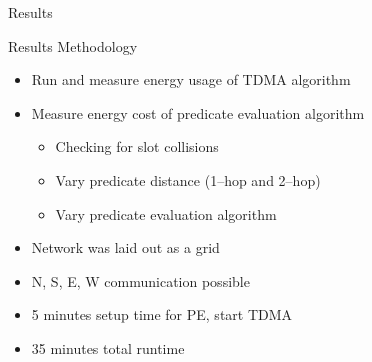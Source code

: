 \documentclass[usenames,dvipsnames]{beamer}
\newcommand{\subtitleframe}[1]{\begin{frame}\begin{block}{\centering\Large \vspace{1em} #1 \vspace{1em}}\end{block}\end{frame}}
\begin{document}
\subtitleframe{Results}

\begin{frame}{Results Methodology}
\begin{itemize}
	\item Run and measure energy usage of TDMA algorithm
	\item Measure energy cost of predicate evaluation algorithm
		\begin{itemize}
			\item Checking for slot collisions
			\item Vary predicate distance (1--hop and 2--hop)
			\item Vary predicate evaluation algorithm
		\end{itemize}
	\item Network was laid out as a grid
	\item N, S, E, W communication possible
	\item 5 minutes setup time for PE, start TDMA
	\item 35 minutes total runtime
\end{itemize}
\end{frame}
\end{document}
